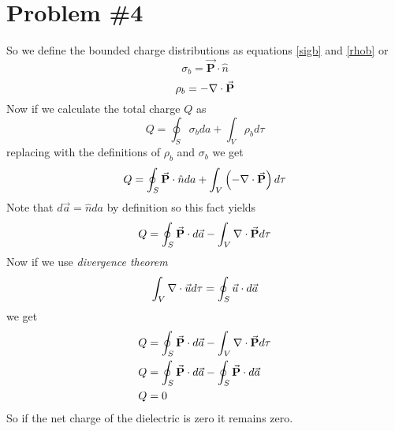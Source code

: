 \documentclass[11pt]{article}
\numberwithin{equation}{section}
\newcommand{\grad}{\bold\nabla}
\newcommand{\vecP}{\vec{\mathbf{P}}}
\begin{document}
\section{Problem \#4}
So we define the bounded charge distributions as equations \ref{sigb} and \ref{rhob} or
$$\sigma_b = \vecP\cdot\hat{n}$$
$$\rho_b = -\grad\cdot\vecP$$
Now if we calculate the total charge $Q$ as
$$Q = \oint_S \sigma_b da +\int_V \rho_b d\tau$$
replacing with the definitions of $\rho_b$ and $\sigma_b$ we get
$$Q = \oint_S \vecP\cdot\hat{n}da +\int_V \left(-\grad\cdot\vecP\right) d\tau$$
Note that $d\vec{a}=\hat{n}da$ by definition so this fact yields
$$Q = \oint_S \vecP\cdot d\vec{a} -\int_V \grad\cdot\vecP d\tau$$
Now if we use \emph{divergence theorem}
$$\int_V \grad\cdot\vec{u}d\tau= \oint_S \vec{u}\cdot d\vec{a}$$
we get
\begin{align*}
Q &= \oint_S \vecP\cdot d\vec{a} -\int_V \grad\cdot\vecP d\tau\\
Q &= \oint_S \vecP\cdot d\vec{a} -\oint_S \vecP\cdot d\vec{a}\\
Q &=0
\end{align*}
So if the net charge of the dielectric is zero it remains zero.
\end{document}
